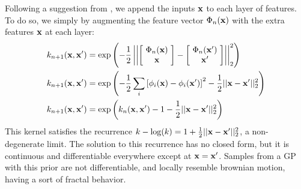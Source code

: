 \documentclass{article}
\begin{document}
Following a suggestion from \cite{neal1995bayesian}, we append the inputs ${\bf{x}}$ to each layer of features.  To do so, we simply by augmenting the feature vector $\Phi_n({\bf{x}})$ with the extra features ${\bf{x}}$ at each layer:
%
\begin{align}
k_{n+1}({\bf{x}}, {\bf{x}}') & = \exp \left( -\frac{1}{2} \left|\left| \left[ \! \begin{array}{c} \Phi_n({\bf{x}}) \\ {\bf{x}} \end{array} \! \right]  - \left[ \! \begin{array}{c} \Phi_n({\bf{x}}') \\ {\bf{x}}' \end{array} \! \right] \right| \right|_2^2 \right) \\
k_{n+1}({\bf{x}}, {\bf{x}}') & = \exp \left( -\frac{1}{2} \sum_i \left[ \phi_i({\bf{x}}) - \phi_i({\bf{x}}') \right]^2 -\frac{1}{2} || {\bf{x}} - {\bf{x}}' ||_2^2 \right) \\
k_{n+1}({\bf{x}}, {\bf{x}}') & = \exp \left( k_n({\bf{x}}, {\bf{x}}') - 1 -\frac{1}{2} || {\bf{x}} - {\bf{x}}' ||_2^2 \right)
\end{align}
%
%
This kernel satisfies the recurrence $k - \log(k) = 1 + \frac{1}{2} || {\bf{x}} - {\bf{x}}' ||_2^2$, a non-degenerate limit.  The solution to this recurrence has no closed form, but it is continuous and differentiable everywhere except at ${\bf{x}} = {\bf{x}}'$.
%
Samples from a GP with this prior are not differentiable, and locally resemble brownian motion, having a sort of fractal behavior.

\end{document}
